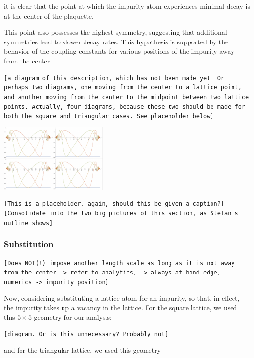 \documentclass[aps,pra,superscriptaddress,twocolumn]{revtex4-1}
\newcommand{\commentSB}[1]{\texttt{\color{blue}[#1]}}
\newcommand{\commentSO}[1]{\texttt{\color{orange}[#1]}}
\newcommand{\commentTP}[1]{\texttt{\color{green}[#1]}}
\begin{document}
it is clear that the point at which the impurity atom experiences minimal decay is at the center of the plaquette. 


This point also possesses the highest symmetry, suggesting that additional symmetries lead to slower decay rates. This hypothesis is supported by the behavior of the coupling constants for various positions of the impurity away from the center 

\commentSB{a diagram of this description, which has not been made yet. Or perhaps two diagrams, one moving from the center to a lattice point, and another moving from the center to the midpoint between two lattice points. Actually, four diagrams, because these two should be made for both the square and triangular cases. See placeholder below}

    \includegraphics[width=0.4\textwidth]{figures/triangle_and_square_interstitial_coupling.png}


\commentSB{This is a placeholder. again, should this be given a caption?}
\commentTP{Consolidate into the two big pictures of this section, as Stefan's outline shows}


\subsubsection{Substitution}
\commentSO{Does NOT(!) impose another length scale as long as it is not away from the center -> refer to analytics, -> always at band edge, numerics -> impurity position}

Now, considering substituting a lattice atom for an impurity, so that, in effect, the impurity takes up a vacancy in the lattice. For the square lattice, we used this $5 \times 5$ geometry for our analysis:

\commentSB{diagram. Or is this unnecessary? Probably not}

and for the triangular lattice, we used this geometry
\end{document}
